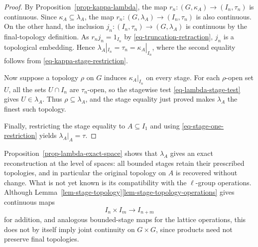 \documentclass[preprint,3p]{elsarticle}
\theoremstyle{plain}
\theoremstyle{definition}
\numberwithin{equation}{section}
\begin{document}
\begin{proof}
By Proposition~\ref{prop-kappa-lambda}, the map
$r_n\colon(G,\kappa_A)\longrightarrow(I_n,\tau_n)$ is continuous.
Since $\kappa_A\subseteq\lambda_A$, the map
$r_n\colon(G,\lambda_A)\longrightarrow(I_n,\tau_n)$
is also continuous.
On the other hand, the inclusion
$j_n\colon(I_n,\tau_n)\longrightarrow(G,\lambda_A)$ is continuous
by the final-topology definition.  As
$r_nj_n=1_{I_n}$ by \eqref{eq-truncation-retraction},
$j_n$ is a topological embedding.  Hence
$\lambda_A|_{I_n}=\tau_n=\kappa_A|_{I_n}$,
where the second equality follows from \eqref{eq-kappa-stage-restriction}.

Now suppose a topology $\rho$ on $G$ induces
$\kappa_A|_{I_n}$ on every stage.  For each
$\rho$-open set $U$, all the sets
$U\cap I_n$ are $\tau_n$-open, so the stagewise
test \eqref{eq-lambda-stage-test} gives $U\in\lambda_A$.
Thus $\rho\subseteq\lambda_A$, and the stage equality
just proved makes $\lambda_A$ the finest such topology.

Finally, restricting the stage equality to
$A\subseteq I_1$ and using
\eqref{eq-stage-one-restriction} yields
$\lambda_A|_A=\tau$.
\end{proof}

Proposition~\ref{prop-lambda-exact-space} shows that $\lambda_A$ gives an
exact reconstruction at the level of spaces: all bounded stages retain
their prescribed topologies, and in particular the original topology on
$A$ is recovered without change.  What is not yet known is its
compatibility with the $\ell$-group operations.  Although
Lemma~\ref{lem-stage-topology}\ref{lem-stage-topology-operations} gives
continuous maps
\[
 I_n\times I_m\longrightarrow I_{n+m}
\]
for addition, and analogous bounded-stage maps for the lattice operations,
this does not by itself imply joint continuity on $G\times G$, since
products need not preserve final topologies.
\end{document}
